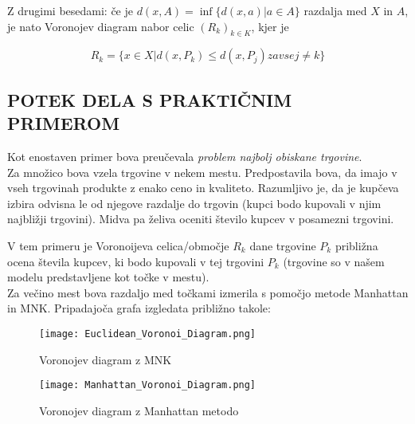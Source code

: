 \documentclass[11pt, a4paper]{article}
\begin{document}
\noindent Z drugimi besedami: če je $d(x,A) = \inf\{d(x,a) | a \in A\}$ razdalja med $X$ in $A$, je nato Voronojev diagram nabor celic $(R_k)_{k \in K}$, kjer je

\begin{equation*}
R_k = \{ x \in X | d(x, P_k) \leq d(x, P_j)   za vse j \neq k \}
\end{equation*}

\subsection{\textbf{POTEK DELA S PRAKTIČNIM PRIMEROM}}

\noindent Kot enostaven primer bova preučevala \textsl{problem najbolj obiskane trgovine}. \\
\noindent Za množico bova vzela trgovine v nekem mestu. Predpostavila bova, da imajo v vseh trgovinah produkte z enako ceno in kvaliteto. Razumljivo je, da je kupčeva izbira odvisna le od njegove razdalje do trgovin (kupci bodo kupovali v njim najbližji trgovini). Midva pa želiva oceniti število kupcev v posamezni trgovini.

\vspace{0,5 cm}

\noindent V tem primeru je Voronoijeva celica/območje $R_k$ dane trgovine $P_k$ približna ocena števila kupcev, ki bodo kupovali v tej trgovini $ P_k$ (trgovine so v našem modelu predstavljene kot točke v mestu). \\
\noindent Za večino mest bova razdaljo med točkami izmerila s pomočjo metode Manhattan in MNK.
Pripadajoča grafa izgledata približno takole:

\begin{figure}[tbp]
\centering
\texttt{[image: Euclidean\_Voronoi\_Diagram.png]}
\caption{Voronojev diagram z MNK}
\end{figure}

\begin{figure}[tbp]
\centering
\texttt{[image: Manhattan\_Voronoi\_Diagram.png]}
\caption{Voronojev diagram z Manhattan metodo}
\end{figure}
\end{document}

